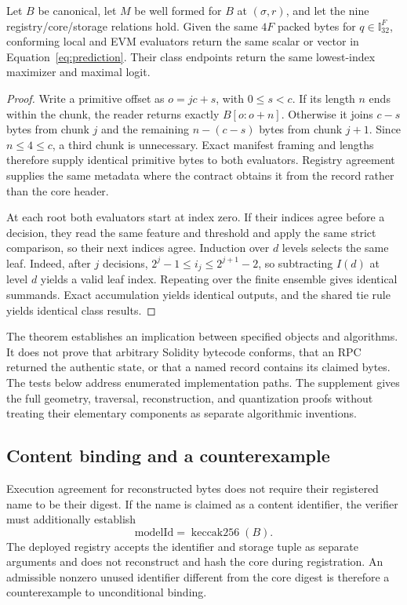 \documentclass{ledger}
\newcommand{\Ithirtytwo}{\mathbb{I}_{32}}
\begin{document}
\begin{theorem}
\label{thm:equivalence}
Let $B$ be canonical, let $M$ be well formed for $B$ at $(\sigma,r)$, and let
the nine registry/core/storage relations hold. Given the same $4F$ packed
bytes for $q\in\Ithirtytwo^F$, conforming local and EVM evaluators return the
same scalar or vector in Equation~\ref{eq:prediction}. Their class endpoints
return the same lowest-index maximizer and maximal logit.
\end{theorem}
\begin{proof}
Write a primitive offset as $o=jc+s$, with $0\le s<c$. If its length $n$ ends
within the chunk, the reader returns exactly $B[o:o+n]$. Otherwise it joins
$c-s$ bytes from chunk $j$ and the remaining $n-(c-s)$ bytes from chunk $j+1$.
Since $n\le4\le c$, a third chunk is unnecessary. Exact manifest framing and
lengths therefore supply identical primitive bytes to both evaluators.
Registry agreement supplies the same metadata where the contract obtains it
from the record rather than the core header.

At each root both evaluators start at index zero. If their indices agree
before a decision, they read the same feature and threshold and apply the
same strict comparison, so their next indices agree. Induction over $d$
levels selects the same leaf. Indeed, after $j$ decisions,
$2^j-1\le i_j\le2^{j+1}-2$, so subtracting $I(d)$ at level $d$ yields a valid
leaf index. Repeating over the finite ensemble gives identical summands.
Exact accumulation yields identical outputs, and the shared tie rule yields
identical class results.
\end{proof}

The theorem establishes an implication between specified objects and
algorithms. It does not prove that arbitrary Solidity bytecode conforms, that
an RPC returned the authentic state, or that a named record contains its
claimed bytes. The tests below address enumerated implementation paths.
The supplement gives the full geometry, traversal, reconstruction, and
quantization proofs without treating their elementary components as separate
algorithmic inventions.

\subsection{Content binding and a counterexample}

Execution agreement for reconstructed bytes does not require their registered
name to be their digest. If the name is claimed as a content identifier, the
verifier must additionally establish
\begin{equation}
 \mathrm{modelId}=\operatorname{keccak256}(B).
 \label{eq:binding}
\end{equation}
The deployed registry accepts the identifier and storage tuple as separate
arguments and does not reconstruct and hash the core during registration.
An admissible nonzero unused identifier different from the core digest is
therefore a counterexample to unconditional binding.
\end{document}
